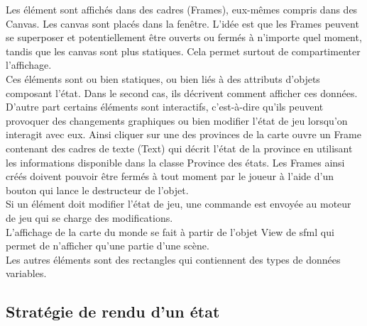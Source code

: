 \documentclass[a4paper,12pt]{article}
\begin{document}
Les élément sont affichés dans des cadres (Frames), eux-mêmes compris dans des Canvas. Les canvas sont placés dans la fenêtre. L'idée est que les Frames peuvent se superposer et potentiellement être ouverts ou fermés à n'importe quel moment, tandis que les canvas sont plus statiques. Cela permet surtout de compartimenter l'affichage.\\

Ces éléments sont ou bien statiques, ou bien liés à des attributs d'objets composant l'état. Dans le second cas, ils décrivent comment afficher ces données.\\
D'autre part certains éléments sont interactifs, c'est-à-dire qu'ils peuvent provoquer des changements graphiques ou bien modifier l'état de jeu lorsqu'on interagit avec eux.
Ainsi cliquer sur une des provinces de la carte ouvre un Frame contenant des cadres de texte (Text) qui décrit l'état de la province en utilisant les informations disponible dans la classe Province des états. Les Frames ainsi créés doivent pouvoir être fermés à tout moment par le joueur à l'aide d'un bouton qui lance le destructeur de l'objet.\\ 
Si un élément doit modifier l'état de jeu, une commande est envoyée au moteur de jeu qui se charge des modifications.\\
L'affichage de la carte du monde se fait à partir de l'objet View de sfml qui permet de n'afficher qu'une partie d'une scène. \\
Les autres éléments sont des rectangles qui contiennent des types de données variables.\\

\subsection{Stratégie de rendu d'un état}
\end{document}
